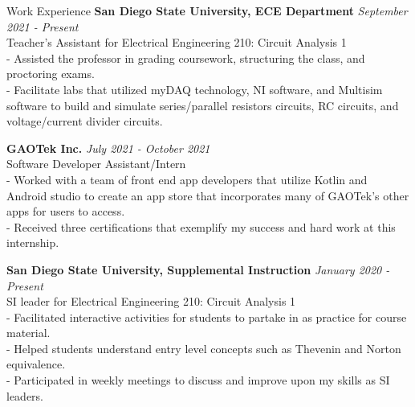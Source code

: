 \documentclass{resume} %
\begin{document}
\begin{rSection}{Work Experience}
{\bf San Diego State University, ECE Department  } \hfill {\em September 2021 - Present} 
\\Teacher’s Assistant for Electrical Engineering 210: Circuit Analysis 1
\\- Assisted the professor in grading coursework, structuring the class, and proctoring exams.
\\-  Facilitate labs that utilized myDAQ technology, NI software, and Multisim software to build and simulate       series/parallel resistors circuits, RC circuits, and voltage/current divider circuits.  

{\bf GAOTek Inc.   } \hfill {\em July 2021 - October 2021} 
\\Software Developer Assistant/Intern
\\- Worked with a team of front end app developers that utilize Kotlin and Android studio to create an app store that incorporates many of GAOTek’s other apps for users to access.
\\- Received three certifications that exemplify my success and hard work at this internship.

{\bf San Diego State University, Supplemental Instruction   } \hfill {\em January 2020 - Present} 
\\SI leader for Electrical Engineering 210: Circuit Analysis 1
\\- Facilitated interactive activities for students to partake in as practice for course material.
\\- Helped students understand entry level concepts such as Thevenin and Norton equivalence.
\\- Participated in weekly meetings to discuss and improve upon my skills as SI leaders.       





\end{rSection}
\end{document}
